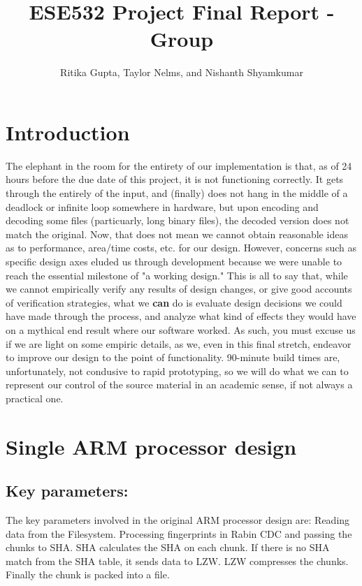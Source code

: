 \documentclass{article}
\title{ESE532 Project Final Report - Group}
\author{Ritika Gupta, Taylor Nelms, and Nishanth Shyamkumar}
\begin{document}
\maketitle

\section{Introduction}
The elephant in the room for the entirety of our implementation is that, as of 24 hours before the due date of this project, it is not functioning correctly.
It gets through the entirely of the input, and (finally) does not hang in the middle of a deadlock or infinite loop somewhere in hardware, but upon encoding and decoding some files (particuarly, long binary files), the decoded version does not match the original.
\newline\newline
Now, that does not mean we cannot obtain reasonable ideas as to performance, area/time costs, etc. for our design. However, concerns such as specific design axes eluded us through development because we were unable to reach the essential milestone of "a working design."
\newline\newline
This is all to say that, while we cannot empirically verify any results of design changes, or give good accounts of verification strategies, what we \textbf{can} do is evaluate design decisions we could have made through the process, and analyze what kind of effects they would have on a mythical end result where our software worked.
\newline\newline
As such, you must excuse us if we are light on some empiric details, as we, even in this final stretch, endeavor to improve our design to the point of functionality. 90-minute build times are, unfortunately, not condusive to rapid prototyping, so we will do what we can to represent our control of the source material in an academic sense, if not always a practical one.

\section{Single ARM processor design}
\subsection{Key parameters:}
The key parameters involved in the original ARM processor design are:
\newline\newline
Reading data from the Filesystem.
\newline
Processing fingerprints in Rabin CDC and passing the chunks to SHA.
\newline
SHA calculates the SHA on each chunk. 
\newline
If there is no SHA match from the SHA table, it sends data to LZW.
\newline
LZW compresses the chunks.
\newline
Finally the chunk is packed into a file.
\newline
\end{document}
